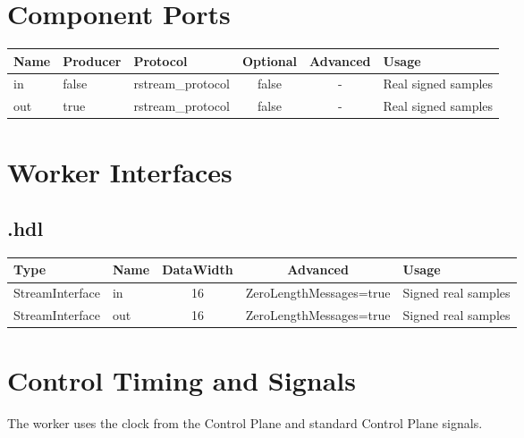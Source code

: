 \begin{landscape}
\section*{Component Ports}
\begin{scriptsize}
	\begin{tabular}{|M{2cm}|M{1.5cm}|M{4cm}|c|c|M{9cm}|}
		\hline
		Name & Producer & Protocol          & Optional & Advanced & Usage               \\
		\hline
		in   & false    & rstream\_protocol & false    & -        & Real signed samples \\
		\hline
		out  & true     & rstream\_protocol & false    & -        & Real signed samples \\
		\hline
	\end{tabular}
\end{scriptsize}

\section*{Worker Interfaces}
\subsection*{\comp.hdl}
\begin{scriptsize}
	\begin{tabular}{|M{2cm}|M{1.5cm}|c|c|M{12cm}|}
		\hline
		Type            & Name & DataWidth & Advanced                & Usage               \\
		\hline
		StreamInterface & in   & 16        & ZeroLengthMessages=true & Signed real samples \\
		\hline
		StreamInterface & out  & 16        & ZeroLengthMessages=true & Signed real samples \\
		\hline
	\end{tabular}
\end{scriptsize}
\end{landscape}

\section*{Control Timing and Signals}
\begin{flushleft}
	The {\Comp} worker uses the clock from the Control Plane and standard Control Plane signals.
\end{flushleft}

